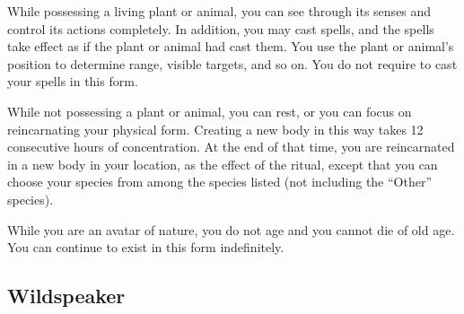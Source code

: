         While possessing a living plant or animal, you can see through its senses and control its actions completely.
        In addition, you may cast spells, and the spells take effect as if the plant or animal had cast them.
        You use the plant or animal's position to determine range, visible targets, and so on.
        You do not require  to cast your spells in this form.

        While not possessing a plant or animal, you can rest, or you can focus on reincarnating your physical form.
        Creating a new body in this way takes 12 consecutive hours of concentration.
        At the end of that time, you are reincarnated in a new body in your location, as the effect of the  ritual, except that you can choose your species from among the species listed (not including the ``Other'' species).

        While you are an avatar of nature, you do not age and you cannot die of old age.
        You can continue to exist in this form indefinitely.

    \subsection{Wildspeaker}\label{Wildspeaker}

